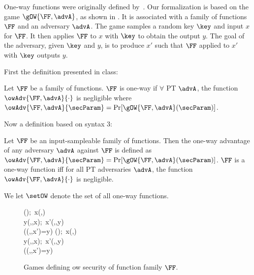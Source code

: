 

One-way functions were originally defined by~\cite{}.
Our formalization is based on the game $\gOW{\FF,\advA}$, as shown in .
It is associated with a family of functions $\FF$ and an adversary $\advA$.
The game samples a random key $\key$ and input $x$ for $\FF$.
It then applies $\FF$ to $x$ with $\key$ to obtain the output $y$.
The goal of the adversary, given $\key$ and $y$, is to produce $x'$ such that $\FF$ applied to $x'$ with $\key$ outputs $y$.

First the definition presented in class:
\begin{defn}
	Let $\FF$ be a family of functions. $\FF$ is one-way if $\forall$ PT $\advA$, the function $\owAdv{\FF,\advA}{\cdot}$ is negligible where $\owAdv{\FF,\advA}{\secParam}=\Pr[\gOW{\FF,\advA}(\secParam)]$.
\end{defn}


Now a definition based on syntax 3:

\begin{defn}
	Let $\FF$ be an input-sampleable family of functions. Then the one-way advantage of any adversary $\advA$ against $\FF$ is defined as $\owAdv{\FF,\advA}{\secParam}=\Pr[\gOW{\FF,\advA}(\secParam)]$. $\FF$ is a one-way function iff for all PT adversaries $\advA$, the function $\owAdv{\FF,\advA}{\cdot}$ is negligible.
\end{defn}

We let $\setOW$ denote the set of all one-way functions.

\begin{figure} [t]
\fbox
{
  {
    \key\getsr\Keys{\FF}(\secParam);\ 
    x\getsr\Dom{\FF}(\secParam,\key)\\
    y\gets \Ev{\FF}(\secIn,\key,x);\ 
    x'\getsr\advA(\secIn,\key,y)\\
    \pcreturn (\Ev{\FF}(\secIn,\key,x')=y)
  }
}
\fbox
{
  {
    \key\getsr\Kg{\FF}(\secIn);\ 
    x\getsr\Is{\FF}(\secIn,\key)\\
    y\gets \Ev{\FF}(\secIn,\key,x);\ 
    x'\getsr\advA(\secIn,\key,y)\\
    \pcreturn (\Ev{\FF}(\secIn,\key,x')=y)
  }
}
\vspace{-2ex}
\caption{Games defining ow security of function family $\FF$.}
\label{fig-ff-ow}
\hrulefill
\end{figure}

